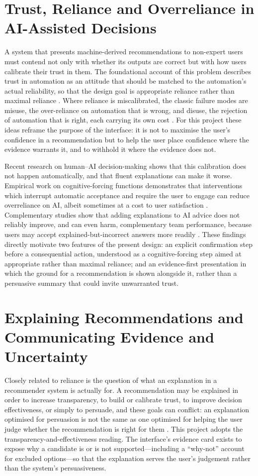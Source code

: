 \section{Trust, Reliance and Overreliance in AI-Assisted Decisions}
\label{sec:reliance}
A system that presents machine-derived recommendations to non-expert users must contend not only with
whether its outputs are correct but with how users calibrate their trust in them. The foundational
account of this problem describes trust in automation as an attitude that should be matched to the
automation's actual reliability, so that the design goal is appropriate reliance rather than maximal
reliance \cite{leesee2004trust}. Where reliance is miscalibrated, the classic failure modes are
misuse, the over-reliance on automation that is wrong, and disuse, the rejection of automation that is
right, each carrying its own cost \cite{parasuraman1997humans}. For this project these ideas reframe
the purpose of the interface: it is not to maximise the user's confidence in a recommendation but to
help the user place confidence where the evidence warrants it, and to withhold it where the evidence
does not.

Recent research on human--AI decision-making shows that this calibration does not happen
automatically, and that fluent explanations can make it worse. Empirical work on cognitive-forcing
functions demonstrates that interventions which interrupt automatic acceptance and require the user to
engage can reduce overreliance on AI, albeit sometimes at a cost to user satisfaction
\cite{bucinca2021trust}. Complementary studies show that adding explanations to AI advice does not
reliably improve, and can even harm, complementary team performance, because users may accept
explained-but-incorrect answers more readily \cite{bansal2021whole}. These findings directly motivate
two features of the present design: an explicit confirmation step before a consequential action,
understood as a cognitive-forcing step aimed at appropriate rather than maximal reliance; and an
evidence-first presentation in which the ground for a recommendation is shown alongside it, rather
than a persuasive summary that could invite unwarranted trust.

\section{Explaining Recommendations and Communicating Evidence and Uncertainty}
\label{sec:explanation}
Closely related to reliance is the question of what an explanation in a recommender system is actually
for. A recommendation may be explained in order to increase transparency, to build or calibrate trust,
to improve decision effectiveness, or simply to persuade, and these goals can conflict: an explanation
optimised for persuasion is not the same as one optimised for helping the user judge whether the
recommendation is right for them \cite{tintarev2012evaluating}. This project adopts the
transparency-and-effectiveness reading. The interface's evidence card exists to expose why a candidate
is or is not supported---including a ``why-not'' account for excluded options---so that the
explanation serves the user's judgement rather than the system's persuasiveness.

